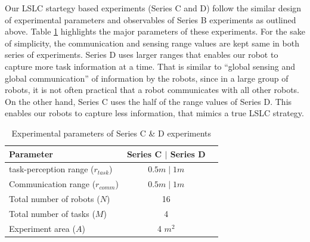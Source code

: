 \documentclass[final,5p,times,twocolumn]{elsarticle}
\begin{document}
Our LSLC startegy based experiments (Series C and D) follow the similar design of experimental parameters and observables of Series B experiments as outlined above. Table \ref{table:local-expt-design} highlights the major parameters of these experiments. For the sake of simplicity, the communication and sensing range values are kept same in both series of experiments.
Series D uses larger ranges that enables our robot to capture more task information at a time. That is similar to  ``global sensing and global communication'' of information by the robots, since in a large group of robots, it is not often practical that a robot communicates with all other robots. On the other hand, Series C uses the half of the range values of Series D. This enables our robots to capture less information, that mimics a true LSLC strategy. 
\begin{table}
\caption{Experimental parameters of Series C \& D experiments}
\label{table:local-expt-design}
\begin{center}
\begin{tabular}{|l|c|c|}
\hline Parameter & \hspace*{0.2cm} Series C $\mid$ Series D\\
\hline task-perception range ($r_{task}$) & $0.5 m \mid 1 m$\\
\hline Communication range ($r_{comm}$) & $0.5 m \mid 1 m$\\
\hline Total number of robots ($N$) & 16 \\
\hline Total number of tasks ($M$) & 4 \\
\hline Experiment area ($A$) & 4 $m^2$\\
\hline
\end{tabular}
\end{center}
\end{table}
% 
\end{document}
